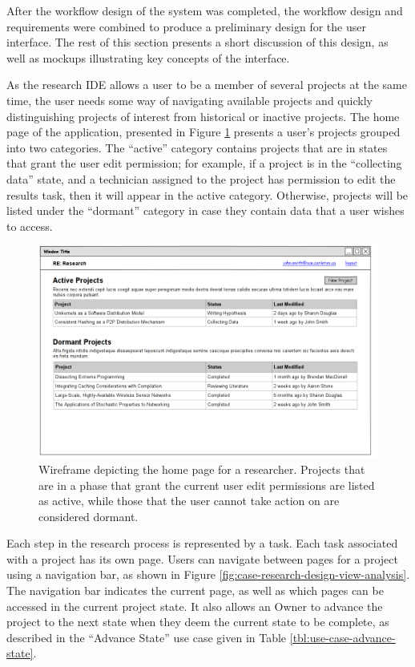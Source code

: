 \documentclass[document.tex]{subfiles}
\begin{document}
After the workflow design of the system was completed, the workflow design and requirements were combined to produce a preliminary design for the user interface. The rest of this section presents a short discussion of this design, as well as mockups illustrating key concepts of the interface.

As the research IDE allows a user to be a member of several projects at the same time, the user needs some way of navigating available projects and quickly distinguishing projects of interest from historical or inactive projects. The home page of the application, presented in Figure \ref{fig:case-research-design-home-page} presents a user's projects grouped into two categories. The ``active'' category contains projects that are in states that grant the user edit permission; for example, if a project is in the ``collecting data'' state, and a technician assigned to the project has permission to edit the results task, then it will appear in the active category. Otherwise, projects will be listed under the ``dormant'' category in case they contain data that a user wishes to access.

\begin{figure}[!ht]
\centering \includegraphics[width=5.5in]{./img/case-study-research-railgun/mockup-home-page}
\caption{Wireframe depicting the home page for a researcher. Projects that are in a phase that grant the current user edit permissions are listed as active, while those that the user cannot take action on are considered dormant.}
\label{fig:case-research-design-home-page}
\end{figure}

Each step in the research process is represented by a task. Each task associated with a project has its own page. Users can navigate between pages for a project using a navigation bar, as shown in Figure \ref{fig:case-research-design-view-analysis}. The navigation bar indicates the current page, as well as which pages can be accessed in the current project state. It also allows an Owner to advance the project to the next state when they deem the current state to be complete, as described in the ``Advance State'' use case given in Table \ref{tbl:use-case-advance-state}.
\end{document}

